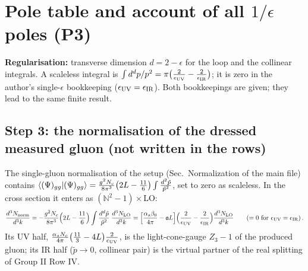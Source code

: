 \documentclass[9pt]{article}
\def\mf#1{\mathbb{#1}}
\numberwithin{equation}{section}
\begin{document}
{\color{red}
\section{Pole table and account of all $1/\epsilon$ poles (P3)}\label{sec:dv-table}
 \textbf{Regularisation:} transverse dimension $d=2-\epsilon$ for the loop and the collinear integrals. A scaleless integral is $\int d^{d}p/p^{2}=\pi\big(\frac{2}{\epsilon_{\rm UV}}-\frac{2}{\epsilon_{\rm IR}}\big)$; it is zero in the author's single-$\epsilon$ bookkeeping ($\epsilon_{\rm UV}=\epsilon_{\rm IR}$). Both bookkeepings are given; they lead to the same finite result.

\subsection*{Step 3: the normalisation of the dressed measured gluon (not written in the rows)}
\noindent The single-gluon normalisation of the setup (Sec.~Normalization of the main file) contains $\braket{(\Psi)_{gg}|(\Psi)_{gg}}=\frac{g^{2}N_{c}}{8\pi^{3}}\big(2L-\frac{11}{6}\big)\int\frac{d^{2}\tilde p}{\tilde p^{2}}$, set to zero as scaleless. In the cross section it enters as $(\mf{N}^{2}-1)\times$LO:
\begin{align}
\frac{d^{3}N_{\rm norm}}{d^{3}k}=-\frac{g^{2}N_{c}}{8\pi^{3}}\Big(2L-\frac{11}{6}\Big)\int\frac{d^{d}\tilde p}{\tilde p^{2}}\;\frac{d^{3}N_{\rm LO}}{d^{3}k}=\Big[\frac{\alpha_{s}\beta_{0}}{4\pi}-\mathfrak{a}L\Big]\Big(\frac{2}{\epsilon_{\rm UV}}-\frac{2}{\epsilon_{\rm IR}}\Big)\frac{d^{3}N_{\rm LO}}{d^{3}k}\qquad(=0\ \text{for}\ \epsilon_{\rm UV}=\epsilon_{\rm IR})\,.\label{eq:dv-norm}
\end{align}
\noindent[Calculation: $\frac{g^{2}N_{c}}{8\pi^{3}}\cdot\pi\cdot\frac{11}{6}=\frac{11g^{2}N_{c}}{48\pi^{2}}=\frac{\alpha_{s}\beta_{0}}{4\pi}$ and $\frac{g^{2}N_{c}}{8\pi^{3}}\cdot\pi\cdot2L=\frac{g^{2}N_{c}}{4\pi^{2}}L=\mathfrak{a}L$.] Its UV half, $\frac{\alpha_{s}N_{c}}{4\pi}\big(\frac{11}{3}-4L\big)\frac{2}{\epsilon_{\rm UV}}$, is the light-cone-gauge $Z_{3}-1$ of the produced gluon; its IR half ($\tilde p\to0$, collinear pair) is the virtual partner of the real splitting of Group II Row IV.

}
\end{document}
